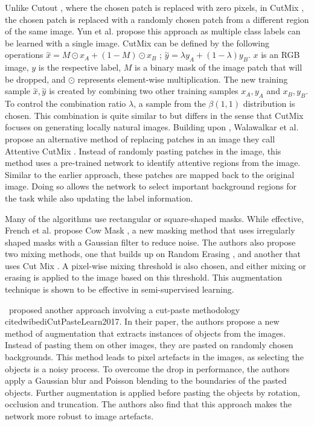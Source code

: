 Unlike Cutout \cite{devriesImprovedRegularizationConvolutional2017}, where the chosen patch is replaced with zero pixels, in CutMix \cite{yunCutMixRegularizationStrategy2019}, the chosen patch is replaced with a randomly chosen patch from a different region of the same image. Yun et al. propose this approach as multiple class labels can be learned with a single image.
CutMix can be defined by the following operations $\overset{\sim}x = M \odot x_{A} + (1-M) \odot x_{B}$ ; $\overset{\sim}y = \lambda y_{A}+ (1- \lambda)y_{B}$. $x$ is an RGB image, $y$ is the respective label, $M$ is a binary mask of the image patch that will be dropped, and $\odot$ represents element-wise multiplication. The new training sample $\overset{\sim}x , \overset{\sim}y$ is created by combining two other training samples $x_{A}, y_{A}$ and $x_{B} , y_{B}$. To control the combination ratio $\lambda$, a sample from the $\beta(1,1)$ distribution is chosen. This combination is quite similar to \cite{zhangMixupEmpiricalRisk2018} but differs in the sense that CutMix focuses on generating locally natural images.
Building upon \cite{yunCutMixRegularizationStrategy2019}, Walawalkar et al. propose an alternative method of replacing patches in an image they call Attentive CutMix \cite{walawalkarAttentiveCutMixEnhanced2020}. Instead of randomly pasting patches in the image, this method uses a pre-trained network to identify attentive regions from the image. Similar to the earlier approach, these patches are mapped back to the original image. Doing so allows the network to select important background regions for the task while also updating the label information.

Many of the algorithms use rectangular or square-shaped masks. While effective, French et al. propose Cow Mask \cite{frenchMilkingCowMaskSemiSupervised2020}, a new masking method that uses irregularly shaped masks with a Gaussian filter to reduce noise. The authors also propose two mixing methods, one that builds up on Random Erasing \cite{zhongRandomErasingData2020}, and another that uses Cut Mix \cite{yunCutMixRegularizationStrategy2019}. A pixel-wise mixing threshold is also chosen, and either mixing or erasing is applied to the image based on this threshold. This augmentation technique is shown to be effective in semi-supervised learning.

\ proposed another approach involving a cut-paste methodology cite{dwibediCutPasteLearn2017}. In their paper, the authors propose a new method of augmentation that extracts instances of objects from the images. Instead of pasting them on other images, they are pasted on randomly chosen backgrounds. This method leads to pixel artefacts in the images, as selecting the objects is a noisy process. To overcome the drop in performance, the authors apply a Gaussian blur and Poisson blending to the boundaries of the pasted objects. Further augmentation is applied before pasting the objects by rotation, occlusion and truncation. The authors also find that this approach makes the network more robust to image artefacts.

